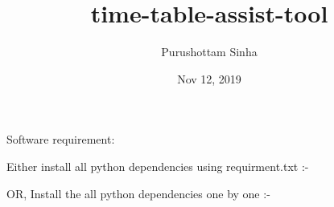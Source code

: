 \documentclass[letterpaper,10pt,english]{sphinxmanual}
\title{time-table-assist-tool}
\date{Nov 12, 2019}
\author{Purushottam Sinha}
\begin{document}
\pagestyle{empty}
\sphinxmaketitle
\pagestyle{plain}
\sphinxtableofcontents
\pagestyle{normal}
\label{\detokenize{index::doc}}



\chapter{}
\label{\detokenize{user_manual:user-manual}}\label{\detokenize{user_manual::doc}}

\section{}
\label{\detokenize{user_manual:setting-up-the-project}}
Software requirement:

Either install all python dependencies using requirment.txt :-

\begin{sphinxVerbatim}[commandchars=\\\{\}]
   
\end{sphinxVerbatim}

OR, Install the all python dependencies one by one :-

\begin{sphinxVerbatim}[commandchars=\\\{\}]
   
 
  
  
  
  
  
  
  
\end{sphinxVerbatim}
\end{document}
